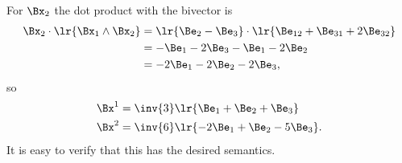 {For \( \Bx_2 \) the dot product with the bivector is
\begin{equation}\label{eqn:2subspaceR3reciprocalExample:100}
\begin{aligned}
\Bx_2 \cdot \lr{ \Bx_1 \wedge \Bx_2 }
&= \lr{ \Be_2 - \Be_3 } \cdot \lr{\Be_{12} + \Be_{31} + 2 \Be_{32} } \\
&= - \Be_1 - 2 \Be_3 - \Be_1 - 2 \Be_2 \\
&= - 2 \Be_1 - 2 \Be_2 - 2 \Be_3,
\end{aligned}
\end{equation}
so
\begin{equation}\label{eqn:2subspaceR3reciprocalExample:120}
\begin{aligned}
\Bx^1 &= \inv{3} \lr{ \Be_1 + \Be_2 + \Be_3 } \\
\Bx^2 &= \inv{6} \lr{ -2 \Be_1 + \Be_2 - 5 \Be_3 }.
\end{aligned}
\end{equation}
It is easy to verify that this has the desired semantics.
} %
